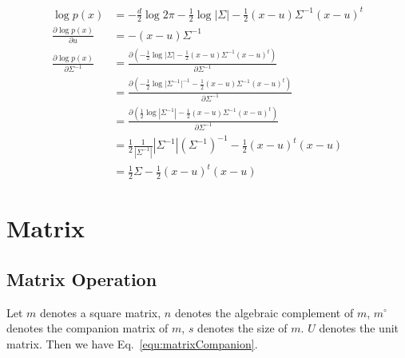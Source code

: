 \documentclass[runningheads,openany]{xhlPaper}
\begin{document}
\begin{equation}
\label{equ:gaussianDerivation}
\begin{aligned}
\log p\left( x \right) &=  - \frac{d}{2}\log 2\pi  - \frac{1}{2}\log |\Sigma | - \frac{1}{2}\left( {x - u} \right){\Sigma ^{ - 1}}{\left( {x - u} \right)^t}\\
\frac{{\partial \log p\left( x \right)}}{{\partial u}} &=  - \left( {x - u} \right){\Sigma ^{ - 1}}\\
\frac{{\partial \log p\left( x \right)}}{{\partial {\Sigma ^{ - 1}}}} &= \frac{{\partial \left( { - \frac{1}{2}\log |\Sigma | - \frac{1}{2}\left( {x - u} \right){\Sigma ^{ - 1}}{{\left( {x - u} \right)}^t}} \right)}}{{\partial {\Sigma ^{ - 1}}}}\\
 &= \frac{{\partial \left( { - \frac{1}{2}\log |{\Sigma ^{ - 1}}{|^{ - 1}} - \frac{1}{2}\left( {x - u} \right){\Sigma ^{ - 1}}{{\left( {x - u} \right)}^t}} \right)}}{{\partial {\Sigma ^{ - 1}}}}\\
 &= \frac{{\partial \left( {\frac{1}{2}\log |{\Sigma ^{ - 1}}| - \frac{1}{2}\left( {x - u} \right){\Sigma ^{ - 1}}{{\left( {x - u} \right)}^t}} \right)}}{{\partial {\Sigma ^{ - 1}}}}\\
 &= \frac{1}{2}\frac{1}{{|{\Sigma ^{ - 1}}|}}|{\Sigma ^{ - 1}}|{\left( {{\Sigma ^{ - 1}}} \right)^{ - 1}} - \frac{1}{2}{\left( {x - u} \right)^t}\left( {x - u} \right)\\
 &= \frac{1}{2}\Sigma  - \frac{1}{2}{\left( {x - u} \right)^t}\left( {x - u} \right)
\end{aligned}
\end{equation}

\section{Matrix}

\subsection{Matrix Operation}
Let $m$ denotes a square matrix, $n$ denotes the algebraic complement of $m$, ${{m^ \circ }}$ denotes the companion matrix of $m$, $s$ denotes the size of $m$. $U$ denotes the unit matrix. Then we have Eq.~\ref{equ:matrixCompanion}.
\end{document}
